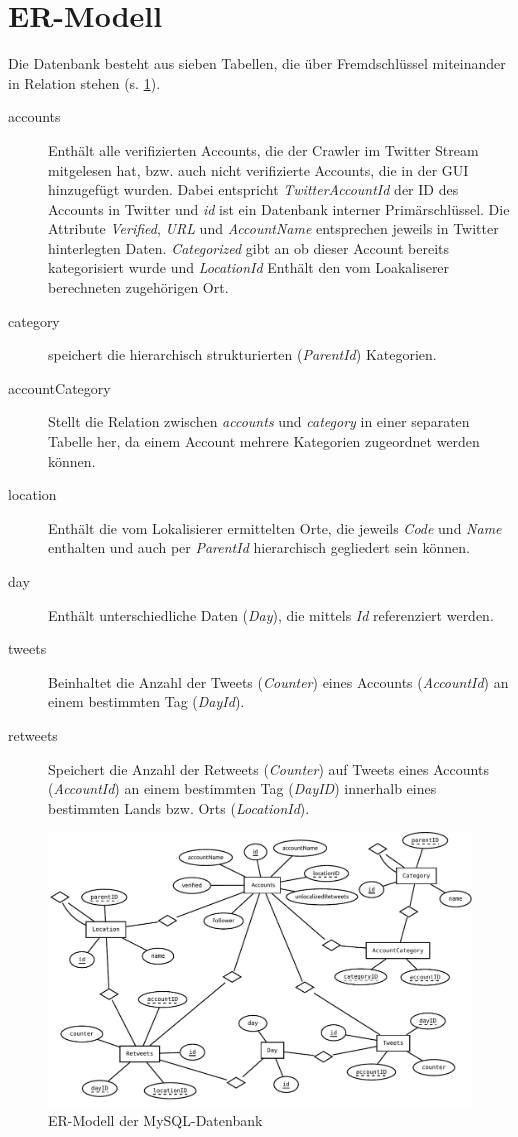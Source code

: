 \section{ER-Modell}
Die Datenbank besteht aus sieben Tabellen, die über Fremdschlüssel miteinander in Relation stehen (s. \cref{fig:mysql-er}).
\begin{description}
	\item[accounts] Enthält alle verifizierten Accounts, die der Crawler im Twitter Stream mitgelesen hat, bzw. auch nicht verifizierte Accounts, die in der GUI hinzugefügt wurden. Dabei entspricht \emph{TwitterAccountId} der ID des Accounts in Twitter und \emph{id} ist ein Datenbank interner Primärschlüssel. Die Attribute \emph{Verified}, \emph{URL} und \emph{AccountName} entsprechen jeweils in Twitter hinterlegten Daten. \emph{Categorized} gibt an ob dieser Account bereits kategorisiert wurde und \emph{LocationId} Enthält den vom Loakaliserer berechneten zugehörigen Ort.
	\item[category] speichert die hierarchisch strukturierten (\emph{ParentId}) Kategorien.
	\item[accountCategory] Stellt die Relation zwischen	\emph{accounts} und \emph{category} in einer separaten Tabelle her, da einem Account mehrere Kategorien zugeordnet werden können.
	\item[location] Enthält die vom Lokalisierer ermittelten Orte, die jeweils \emph{Code} und \emph{Name} enthalten und auch per \emph{ParentId} hierarchisch gegliedert sein können.	
	\item[day] Enthält unterschiedliche Daten (\emph{Day}), die mittels \emph{Id} referenziert werden.
	\item[tweets] Beinhaltet die Anzahl der Tweets (\emph{Counter}) eines Accounts (\emph{AccountId}) an einem bestimmten Tag (\emph{DayId}).
	\item[retweets] Speichert die Anzahl der Retweets (\emph{Counter}) auf Tweets eines Accounts (\emph{AccountId}) an einem bestimmten Tag (\emph{DayID}) innerhalb eines bestimmten Lands bzw. Orts (\emph{LocationId}).
\end{description}
\begin{figure}[h!]
	\centering
	\includegraphics[width=\textwidth,height=\textheight, keepaspectratio=true]{dia/er}
	\caption{ER-Modell der MySQL-Datenbank}
	\label{fig:mysql-er}
\end{figure}

